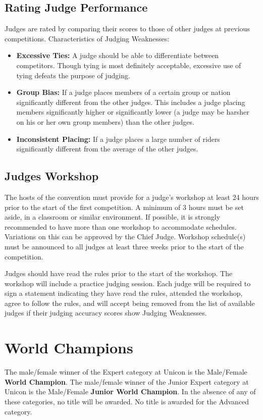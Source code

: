 \subsection{Rating Judge Performance}
Judges are rated by comparing their scores to those of other judges at previous competitions.
Characteristics of Judging Weaknesses:
\begin{itemize}
\item \textbf{Excessive Ties:}
A judge should be able to differentiate between competitors.
Though tying is most definitely acceptable, excessive use of tying defeats the purpose of judging.
\item \textbf{Group Bias:}
If a judge places members of a certain group or nation significantly different from the other judges.
This includes a judge placing members significantly higher or significantly lower (a judge may be harsher on his or her own group members) than the other judges.
\item\textbf{Inconsistent Placing:}
If a judge places a large number of riders significantly different from the average of the other judges.
\end{itemize}

\subsection{Judges Workshop}
The hosts of the convention must provide for a judge's workshop at least 24 hours prior to the start of the first competition.
A minimum of 3 hours must be set aside, in a classroom or similar environment.
If possible, it is strongly recommended to have more than one workshop to accommodate schedules.
Variations on this can be approved by the Chief Judge.
Workshop schedule(s) must be announced to all judges at least three weeks prior to the start of the competition.

Judges should have read the rules prior to the start of the workshop.
The workshop will include a practice judging session.
Each judge will be required to sign a statement indicating they have read the rules, attended the workshop, agree to follow the rules, and will accept being removed from the list of available judges if their judging accuracy scores show Judging Weaknesses.

\section{World Champions}
The male/female winner of the Expert category at Unicon is the Male/Female \textbf{World Champion}.
The male/female winner of the Junior Expert category at Unicon is the Male/Female \textbf{Junior World Champion}.
In the absence of any of these categories, no title will be awarded.
No title is awarded for the Advanced category.

